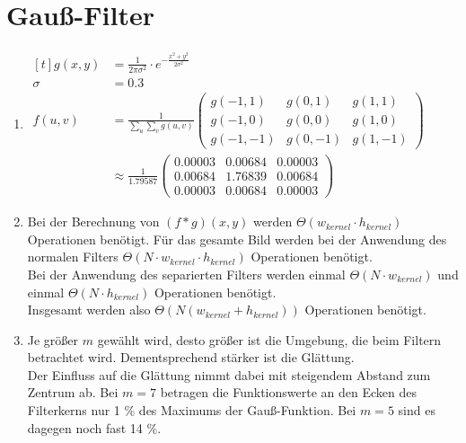 \section{Gauß-Filter}
\begin{enumerate}
	\setlength\itemsep{2em}
	\item $\begin{aligned}[t]
			      g(x,y) & = \frac{1}{2 \pi \sigma^2} \cdot e^{- \frac{x^2 + y^2}{2\sigma^2}} \\
			      \sigma & = 0.3                                                              \\
			      f(u,v) & =\frac{1}{\sum_u\sum_v g(u,v)} \begin{pmatrix}
				                                              g(-1,1)  & g(0,1)  & g(1,1)  \\
				                                              g(-1,0)  & g(0,0)  & g(1,0)  \\
				                                              g(-1,-1) & g(0,-1) & g(1,-1)
			                                              \end{pmatrix}        \\
			             & \approx \frac{1}{1.79587} \begin{pmatrix}
				                                         0.00003 & 0.00684 & 0.00003 \\
				                                         0.00684 & 1.76839 & 0.00684 \\
				                                         0.00003 & 0.00684 & 0.00003
			                                         \end{pmatrix}
		      \end{aligned}$
	\item Bei der Berechnung von $(f\ast g)(x,y)$ werden $\Theta(w_{kernel} \cdot h_{kernel})$ Operationen benötigt.
	      Für das gesamte Bild werden bei der Anwendung des normalen Filters
	      $\Theta(N \cdot w_{kernel} \cdot h_{kernel})$ Operationen benötigt.\\

	      Bei der Anwendung des separierten Filters werden einmal $\Theta(N \cdot w_{kernel})$
	      und einmal  $\Theta(N \cdot h_{kernel})$ Operationen benötigt.\\
	      Insgesamt werden also $\Theta(N (w_{kernel} + h_{kernel}))$ Operationen benötigt.

	\item Je größer $m$ gewählt wird, desto größer ist die Umgebung, die beim Filtern betrachtet wird.
	      Dementsprechend stärker ist die Glättung.\\
	      Der Einfluss auf die Glättung nimmt dabei mit steigendem Abstand zum Zentrum ab.
	      Bei $m=7$ betragen die Funktionswerte an den Ecken des Filterkerns nur 1 \% des Maximums der Gauß-Funktion.
	      Bei $m=5$ sind es dagegen noch fast 14 \%.



\end{enumerate}